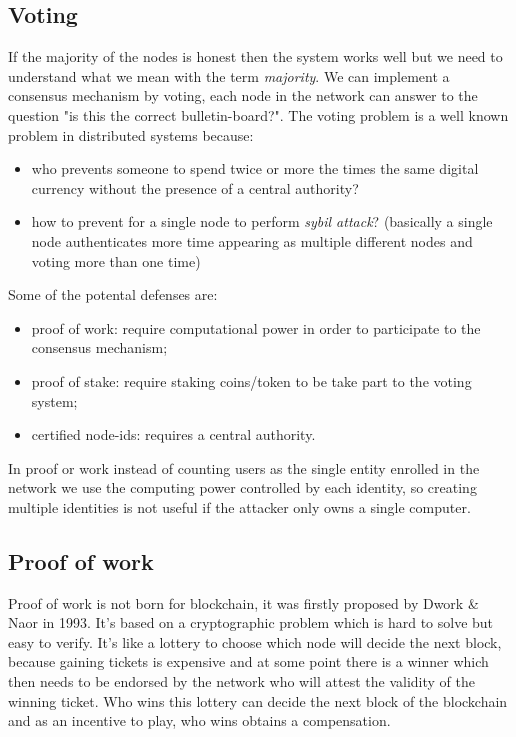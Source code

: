 \subsection{Voting}
If the majority of the nodes is honest then the system works well but we need to understand what we mean with the term \emph{majority}.
We can implement a consensus mechanism by voting, each node in the network can answer to the question "is this the correct bulletin-board?".
The voting problem is a well known problem in distributed systems because:
\begin{itemize}
    \item who prevents someone to spend twice or more the times the same digital currency without the presence of a central authority?
    \item how to prevent for a single node to perform \emph{sybil attack}? (basically a single node authenticates more time appearing as multiple different nodes and voting more than one time)
\end{itemize}

Some of the potental defenses are:
\begin{itemize}
    \item proof of work: require computational power in order to participate to the consensus mechanism;
    \item proof of stake: require staking coins/token to be take part to the voting system;
    \item certified node-ids: requires a central authority.
\end{itemize}

In proof or work instead of counting users as the single entity enrolled in the network we use the computing power controlled by each identity, so creating multiple identities is not useful if the attacker only owns a single computer.

\subsection{Proof of work}
Proof of work is not born for blockchain, it was firstly proposed by Dwork \& Naor in 1993.
It's based on a cryptographic problem which is hard to solve but easy to verify.
It's like a lottery to choose which node will decide the next block, because gaining tickets is expensive and at some point there is a winner which then needs to be endorsed by the network who will attest the validity of the winning ticket.
Who wins this lottery can decide the next block of the blockchain and as an incentive to play, who wins obtains a compensation.

